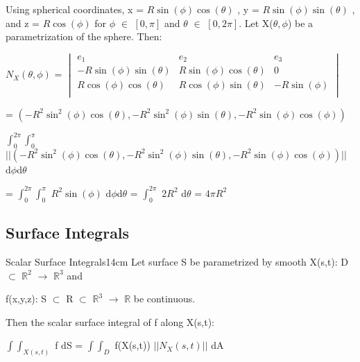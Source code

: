     \begin{tbox}
        Using spherical coordinates,
        x = $R \sin(\phi) \cos(\theta)$ , y = $R \sin(\phi) \sin(\theta)$ ,
        and z = $R \cos(\phi)$ for $\phi$ $\in$ $[0,\pi]$
        and $\theta$ $\in$ $[0,2\pi]$. Let X($\theta,\phi$) be
        a parametrization of the sphere. Then:

        \hspace{0.5cm}
        $N_X(\theta,\phi)$
        = $\begin{vmatrix}
            e_1 & e_2 & e_3 \\
            
            -R \sin(\phi) \sin(\theta)
            & R \sin(\phi) \cos(\theta)
            & 0 \\

            R \cos(\phi) \cos(\theta)
            & R \cos(\phi) \sin(\theta)
            & -R \sin(\phi) \\
        \end{vmatrix}$
        
        \hspace{2.2cm}
        = $(-R^2 \sin^2(\phi) \cos(\theta), -R^2 \sin^2(\phi) \sin(\theta) ,
            -R^2 \sin(\phi) \cos(\phi))$

        
        $\int_0^{2\pi} \int_0^{\pi}$
            $|| (-R^2 \sin^2(\phi) \cos(\theta), -R^2 \sin^2(\phi) \sin(\theta) ,
            -R^2 \sin(\phi) \cos(\phi)) ||$ d$\phi$d$\theta$
    
        = $\int_0^{2\pi} \int_0^{\pi}$ $R^2 \sin(\phi)$ d$\phi$d$\theta$
        = $\int_0^{2\pi}$ $2R^2$ d$\theta$
        = $4\pi R^2$
    \end{tbox}

    \newpage





\subsection{ Surface Integrals }

    \begin{definition}{Scalar Surface Integrals}{14cm}
        Let surface S be parametrized by smooth X(s,t):
        D $\subset$ $\mathbb{R}^2$ $\rightarrow$ $\mathbb{R}^3$ and
        
        f(x,y,z): S $\subset$ R $\subset$ $\mathbb{R}^3$
        $\rightarrow$ $\mathbb{R}$ be continuous.

        Then the {\color{lblue} scalar surface integral} of f along X(s,t):

        \hspace{0.5cm}
        $\int \int_{X(s,t)}$ f dS
        = $\int \int_D$ f(X(s,t)) $||N_X(s,t)||$ dA
    \end{definition}

